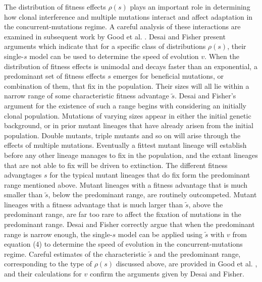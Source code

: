 \documentclass[12pt, one column]{article}
\begin{document}
The distribution of fitness effects $\rho(s)$ plays an important role in determining how clonal interference and multiple mutations interact and affect adaptation in the concurrent-mutations regime.  A careful analysis of these interactions are examined in subsequent work by Good et al. \cite{Goodetal12}.  Desai and Fisher present arguments which indicate that for a specific class of distributions $\rho(s)$, their single-$s$ model can be used to determine the speed of evolution $v$.  When the distribution of fitness effects is unimodal and decays faster than an exponential, a predominant set of fitness effects $s$ emerges for beneficial mutations, or combination of them, that fix in the population.  Their sizes will all lie within a narrow range of some characteristic fitness advantage $\tilde{s}$.  Desai and Fisher's argument for the existence of such a range begins with considering an initially clonal population.  Mutations of varying sizes appear in either the initial genetic background, or in prior mutant lineages that have already arisen from the initial population.  Double mutants, triple mutants and so on will arise through the effects of multiple mutations.  Eventually a fittest mutant lineage will establish before any other lineage manages to fix in the population, and the extant lineages that are not able to fix will be driven to extinction.  The different fitness advangtages $s$ for the typical mutant lineages that do fix form the predominant range mentioned above.  Mutant lineages with a fitness advantage that is much smaller than $\tilde{s}$, below the predominant range, are routinely outcompeted.  Mutant lineages with a fitness advantage that is much larger than $\tilde{s}$, above the predominant range, are far too rare to affect the fixation of mutations in the predominant range.  Desai and Fisher correctly argue that when the predominant range is narrow enough, the single-$s$ model can be applied using $\tilde{s}$ with $v$ from equation (4) to determine the speed of evolution in the concurrent-mutations regime.  Careful estimates of the characteristic $\tilde{s}$ and the predominant range, corresponding to the type of $\rho(s)$ discussed above, are provided in Good et al. \cite{Goodetal12}, and their calculations for $v$ confirm the arguments given by Desai and Fisher.   
\end{document}
